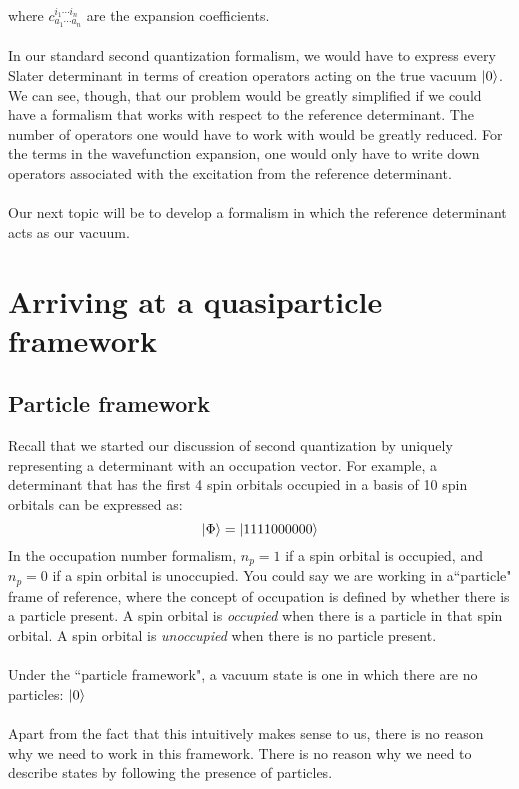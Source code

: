 \documentclass{article}
\newcommand{\kphi}{\ensuremath{\ket{\Phi}} }
\newcommand{\cd}{\ensuremath{\cdots} }
\begin{document}
where $c_{a_1 \cd a_n}^{i_1 \cd i_n}$ are the expansion coefficients. 
\\ \\
In our standard second quantization formalism, we would have to express every Slater determinant in terms of creation operators acting on the true vacuum $\ket{0}$. 
We can see, though, that our problem would be greatly simplified if we could have a formalism that works with respect to the reference determinant. 
The number of operators one would have to work with would be greatly reduced.
For the terms in the wavefunction expansion, one would only have to write down operators associated with the excitation from the reference determinant. 
\\ \\
Our next topic will be to develop a formalism in which the reference determinant acts as our vacuum. 
\section{Arriving at a quasiparticle framework}
\subsection{Particle framework}
Recall that we started our discussion of second quantization by uniquely representing a determinant with an occupation vector. 
For example, a determinant that has the first 4 spin orbitals occupied in a basis of 10 spin orbitals can be expressed as: 
\[\kphi = \ket{1111000000} \]
In the occupation number formalism, $n_p = 1$ if a spin orbital is occupied, and $n_p = 0$ if a spin orbital is unoccupied. 
You could say we are working in a``particle" frame of reference, where the concept of occupation is defined by whether there is a particle present. 
A spin orbital is \textit{occupied} when there is a particle in that spin orbital.
A spin orbital is \textit{unoccupied} when there is no particle present. 
\\ \\
Under the ``particle framework", a vacuum state is one in which there are no particles: $\ket{0}$
\\ \\
Apart from the fact that this intuitively makes sense to us, there is no reason why we need to work in this framework. 
There is no reason why we need to describe states by following the presence of particles. 
\end{document}
